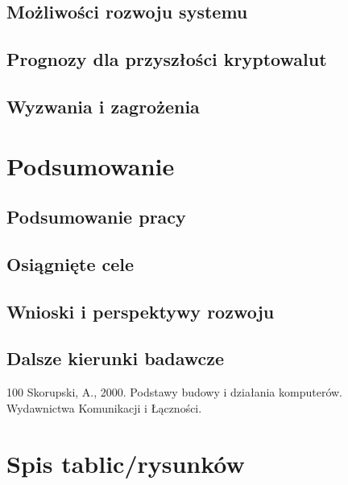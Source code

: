 \documentclass[12pt, a4paper, onside, polish]{article}				%
\begin{document}
\subsection{Możliwości rozwoju systemu}
\subsection{Prognozy dla przyszłości kryptowalut}
\subsection{Wyzwania i zagrożenia}

\section{Podsumowanie}
\subsection{Podsumowanie pracy}
\subsection{Osiągnięte cele}
\subsection{Wnioski i perspektywy rozwoju}
\subsection{Dalsze kierunki badawcze}



\cleardoublepage



\begin{thebibliography}{100}
 Skorupski, A., 2000. Podstawy budowy i działania komputerów. Wydawnictwa Komunikacji i Łączności.



\end{thebibliography}


\cleardoublepage
\section{Spis tablic/rysunków}
\begin{appendix}
\listoftables
\listoffigures
\end{appendix}

\cleardoublepage
\end{document}
